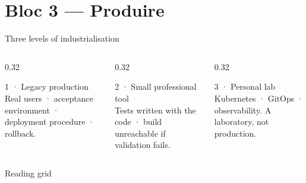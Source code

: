 \section{Bloc 3 — Produire}


\begin{frame}{Three levels of industrialisation}
\begin{columns}[T]
\begin{column}{0.32\linewidth}
\begin{block}{1 · Legacy production}
\centering{}\\[0.25em]
\small Real users · acceptance environment · deployment procedure · rollback.
\end{block}
\end{column}
\begin{column}{0.32\linewidth}
\begin{block}{2 · Small professional tool}
\centering{}\\[0.25em]
\small Tests written with the code · build unreachable if validation fails.
\end{block}
\end{column}
\begin{column}{0.32\linewidth}
\begin{block}{3 · Personal lab}
\centering{}\\[0.25em]
\small Kubernetes · GitOps · observability. A laboratory, not production.
\end{block}
\end{column}
\end{columns}
\vspace{0.65em}
\begin{block}{Reading grid}
\centering{}
\end{block}
\end{frame}


